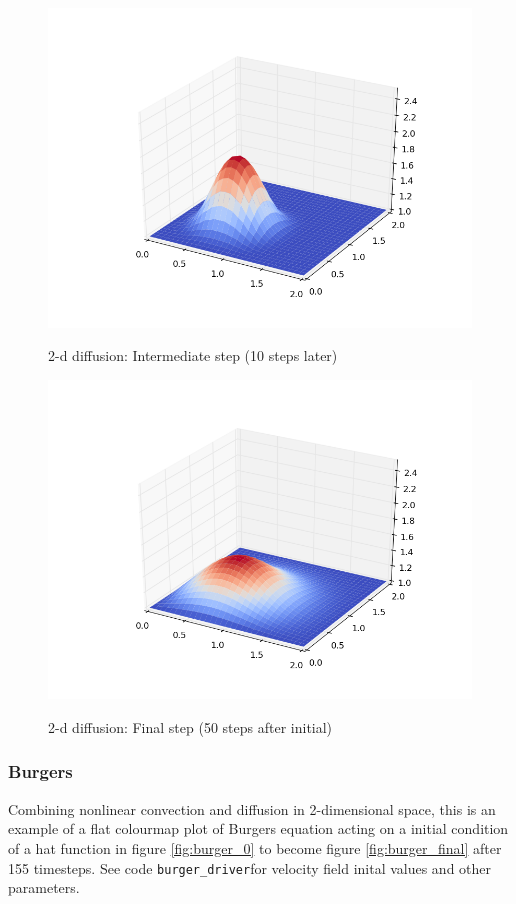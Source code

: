 \documentclass[11pt]{article}
\begin{document}
{	\begin{figure}[diff_1]
	\centering
	\caption{2-d diffusion: Intermediate step (10 steps later)}
	\includegraphics[scale=0.8]{diff_1.png}
	\label{fig:diff_1}
	\end{figure}
	
	\begin{figure}[diff_final]
	\centering
	\caption{2-d diffusion: Final step (50 steps after initial)}
	\includegraphics[scale=0.8]{diff_final.png}
	\label{fig:diff_final}
	\end{figure}

\subsubsection{Burgers}
Combining nonlinear convection and diffusion in 2-dimensional space, this is an example
of a flat colourmap plot of Burgers equation acting on a initial condition of a hat
function in figure \ref{fig:burger_0} to become figure \ref{fig:burger_final} after
155 timesteps. See code \texttt{burger\_driver}for velocity field inital values and other
parameters.

}
\end{document}
